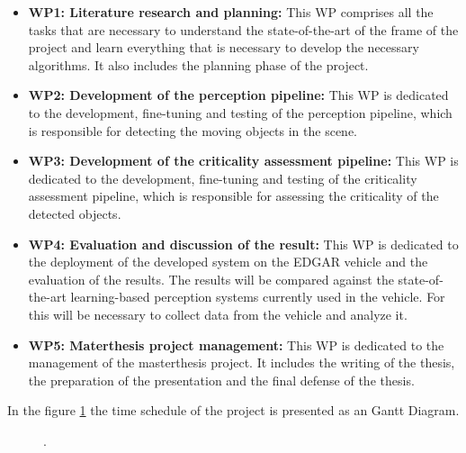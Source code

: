 \begin{itemize}
  \item \textbf{WP1: Literature research and planning:} This WP comprises all the tasks
   that are necessary to understand the state-of-the-art of the frame of the project and 
   learn everything that is necessary to develop the necessary algorithms. It also includes
   the planning phase of the project.

  \item \textbf{WP2: Development of the perception pipeline:} This WP is dedicated to the development,
  fine-tuning and testing of the perception pipeline, which is responsible for detecting the moving objects in the scene.

  \item \textbf{WP3: Development of the criticality assessment pipeline:} This WP is dedicated to the development,
  fine-tuning and testing of the criticality assessment pipeline, which is responsible for assessing the criticality of the detected objects.
  \item \textbf{WP4: Evaluation and discussion of the result:} This WP is dedicated to the deployment of the developed system on the EDGAR vehicle
  and the evaluation of the results. The results will be compared against the state-of-the-art learning-based perception systems currently used in the vehicle.
  For this will be necessary to collect data from the vehicle and analyze it. 
  \item \textbf{WP5: Materthesis project management:} This WP is dedicated to the management of the masterthesis project. It includes the writing of the thesis, the preparation of the presentation and the final defense of the thesis.

\end{itemize}

In the figure \ref{fig:timeschedule} the time schedule of the project is presented as an Gantt Diagram.
\begin{figure}[htb]%
  \hspace*{-2.5cm} %
  \FTMlangGerEng{}{}%
  \caption{.}%
  \label{fig:timeschedule}%
\end{figure}%

